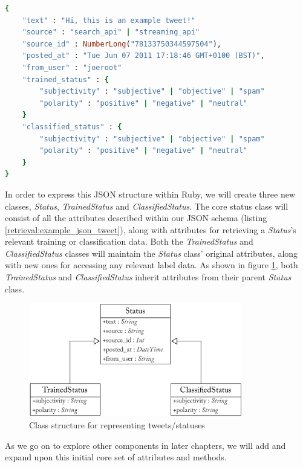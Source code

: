 \begin{lstlisting}[language=Ruby, caption={Basic JSON structure for status objects stored in MongoDB}, label=retrieval:example_json_tweet]
{
	"text" : "Hi, this is an example tweet!"
	"source" : "search_api" | "streaming_api"
	"source_id" : NumberLong("78133750344597504"),
	"posted_at" : "Tue Jun 07 2011 17:18:46 GMT+0100 (BST)",
	"from_user" : "joeroot"
	"trained_status" : {
		"subjectivity" : "subjective" | "objective" | "spam"
		"polarity" : "positive" | "negative" | "neutral"
	}
	"classified_status" : {
		"subjectivity" : "subjective" | "objective" | "spam"
		"polarity" : "positive" | "negative" | "neutral"
	}
}
\end{lstlisting}

In order to express this JSON structure within Ruby, we will create three new classes, \emph{Status}, \emph{TrainedStatus} and \emph{ClassifiedStatus}. The core status class will consist of all the attributes described within our JSON schema (listing \ref{retrieval:example_json_tweet}), along with attributes for retrieving a \emph{Status}'s relevant training or classification data. Both the \emph{TrainedStatus} and \emph{ClassifiedStatus} classes will maintain the \emph{Status} class' original attributes, along with new ones for accessing any relevant label data. As shown in figure \ref{fig:status_uml}, both \emph{TrainedStatus} and \emph{ClassifiedStatus} inherit attributes from their parent \emph{Status} class.

\begin{figure}[h!]
	\caption{Class structure for representing tweets/statuses}
	\label{fig:status_uml}
	\centering
	\includegraphics[width=0.83\textwidth]{figures/status_uml_class_diagram.pdf}
\end{figure}

As we go on to explore other components in later chapters, we will add and expand upon this initial core set of attributes and methods. 

